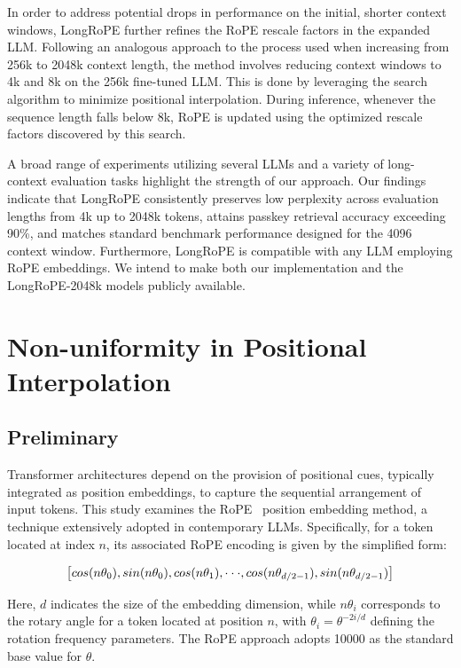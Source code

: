 In order to address potential drops in performance on the initial, shorter context windows, {LongRoPE} further refines the RoPE rescale factors in the expanded LLM. Following an analogous approach to the process used when increasing from 256k to 2048k context length, the method involves reducing context windows to 4k and 8k on the 256k fine-tuned LLM. This is done by leveraging the search algorithm to minimize positional interpolation. During inference, whenever the sequence length falls below 8k, RoPE is updated using the optimized rescale factors discovered by this search.

A broad range of experiments utilizing several LLMs and a variety of long-context evaluation tasks highlight the strength of our approach. Our findings indicate that LongRoPE consistently preserves low perplexity across evaluation lengths from 4k up to 2048k tokens, attains passkey retrieval accuracy exceeding 90\%, and matches standard benchmark performance designed for the 4096 context window. Furthermore, LongRoPE is compatible with any LLM employing RoPE embeddings. We intend to make both our implementation and the LongRoPE-2048k models publicly available.

\section{Non-uniformity in Positional Interpolation}
\label{sec:analysis}

\subsection{Preliminary}

Transformer architectures depend on the provision of positional cues, typically integrated as position embeddings, to capture the sequential arrangement of input tokens. This study examines the RoPE~\cite{rope} position embedding method, a technique extensively adopted in contemporary LLMs. Specifically, for a token located at index $n$, its associated RoPE encoding is given by the simplified form:

\begin{equation}
		\fontsize{7.8}{7.8} \selectfont
	\label{eq:rope}
	\left[ cos(n\theta_0), sin(n\theta_0), cos(n\theta_1), \cdot\cdot\cdot, cos(n\theta_{d/2-1}), sin(n\theta_{d/2-1}) \right]   
\end{equation}

Here, $d$ indicates the size of the embedding dimension, 
while $n\theta_i$ corresponds to the rotary angle for a token located at position $n$, 
with $\theta_i = \theta^{-2i/d}$ defining the rotation frequency parameters. The RoPE approach adopts 10000 as the standard base value for $\theta$.

